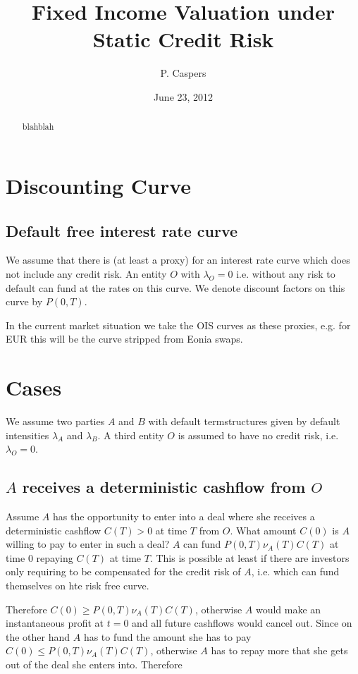 \documentclass{article}%
\begin{document}
\title{Fixed Income Valuation under Static Credit Risk}
\author{P. Caspers}
\date{June 23, 2012}
\maketitle

\begin{abstract}
blahblah
\end{abstract}


\section{Discounting Curve}

\subsection{Default free interest rate curve}

We assume that there is (at least a proxy) for an interest rate curve which does not include any credit risk. An entity $O$ with $\lambda_O=0$ i.e.
without any risk to default can fund at the rates on this curve. We denote discount factors on this curve by $P(0,T)$.

In the current market situation we take the OIS curves as these proxies, e.g. for EUR this will be the curve stripped from Eonia swaps.

\section{Cases}
We assume two parties $A$ and $B$ with default termstructures given by default intensities $\lambda_A$ and $\lambda_B$. A third entity $O$ is assumed
to have no credit risk, i.e. $\lambda_O=0$.

\subsection{$A$ receives a deterministic cashflow from $O$}

Assume $A$ has the opportunity to enter into a deal where she receives a deterministic cashflow $C(T)>0$ at time $T$ from $O$. What amount $C(0)$ is $A$ willing to pay to enter in such a deal? $A$ can fund $P(0,T) \nu_A(T) C(T)$ at time $0$ repaying $C(T)$ at time $T$. This is possible at least if there are investors only requiring to be compensated for the credit risk of $A$, i.e. which can fund themselves on hte risk free curve.

Therefore $C(0) \geq P(0,T) \nu_A(T) C(T)$, otherwise $A$ would make an instantaneous profit at $t=0$ and all future cashflows would cancel out. Since on the other hand $A$ has to fund the amount she has to pay $C(0) \leq P(0,T) \nu_A(T) C(T)$, otherwise $A$ has to repay more that she gets out of the deal she enters into. Therefore
\end{document}

